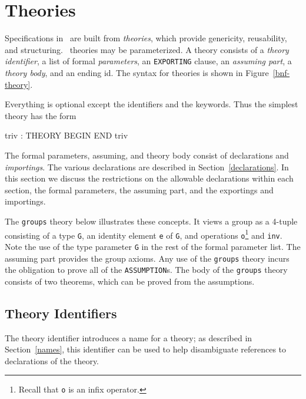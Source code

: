 
\chapter{Theories}\label{theories}

Specifications in \pvs\ are built from \emph{theories}, which provide
genericity, reusability, and structuring.  \pvs\ theories may be
parameterized.  A theory consists of a \emph{theory
identifier}, a list of formal \emph{parameters}, an \texttt{EXPORTING}
clause, an \emph{assuming part}, a \emph{theory body}, and an ending
id.  The syntax for theories is shown in Figure~\ref{bnf-theory}.


Everything is optional except the identifiers and the keywords.  Thus
the simplest theory has the form
\begin{pvsex}
  triv : THEORY
    BEGIN
    END triv
\end{pvsex}

The formal parameters, assuming, and theory body consist of declarations
and \emph{importings}.  The various declarations are described in
Section~\ref{declarations}.  In this section we discuss the restrictions
on the allowable declarations within each section, the formal parameters,
the assuming part, and the exportings and importings.

The \texttt{groups} theory below illustrates these concepts.  It views a
group as a 4-tuple consisting of a type \texttt{G}, an identity element
\texttt{e} of \texttt{G}, and operations \texttt{o}\footnote{Recall that
\texttt{o} is an infix operator.} and \texttt{inv}.  Note the use of the
type parameter \texttt{G} in the rest of the formal parameter list.  The
assuming part provides the group axioms.  Any use of the \texttt{groups}
theory incurs the obligation to prove all of the \texttt{ASSUMPTION}s.
The body of the \texttt{groups} theory consists of two theorems, which can
be proved from the assumptions.


\section{Theory Identifiers}

The theory identifier introduces a name for a theory; as described in
Section~\ref{names}, this identifier can be used to help disambiguate
references to declarations of the theory.

